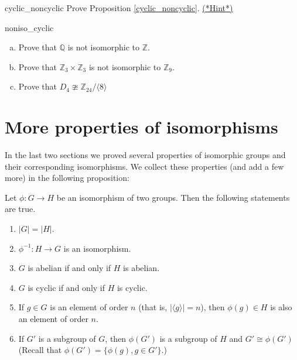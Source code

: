 \begin{exercise}{cyclic_noncyclic} 
Prove Proposition \ref{cyclic_noncyclic}.
\hyperref[sec:isomorph:hints]{(*Hint*)}
\end{exercise}



\begin{exercise}{noniso_cyclic}
\begin{enumerate}[(a)]
\item
Prove that ${\mathbb Q}$ is not isomorphic to ${\mathbb Z}$.
\item
Prove that  ${\mathbb Z}_3 \times {\mathbb Z}_3$ is not isomorphic to ${\mathbb Z}_9$. 
\item
Prove that  $D_4 \ncong {\mathbb Z}_{24} / \langle 8 \rangle$
\end{enumerate}
\end{exercise}



\section{More properties of isomorphisms\quad
{}}\label{iso_properties}
In the last two sections we  proved several properties of isomorphic groups and their corresponding isomorphisms.  We collect these properties (and add a few more) in the following proposition:

\begin{thm}\label{isomorph_theorem_1}
Let $\phi : G \rightarrow H$ be an isomorphism of two groups.  Then the following statements are true. 
\begin{enumerate}[(1)]
 

\rm \item 
$|G| = |H|$. 

\rm \item 
$\phi^{-1} : H \rightarrow G$ is an isomorphism. 

\rm \item 
$G$ is abelian if and only if $H$ is abelian. 

\rm \item 
$G$ is cyclic if and only if $H$ is cyclic. 

\rm \item
If $g \in G$ is an element of order $n$ (that is, $| \langle g \rangle | = n$), then 
$\phi(g) \in H$ is also an element of order $n$.

\rm \item 
If $G'$  is a subgroup of $G$, then $\phi(G') $ is a subgroup of  $H$ and $G' \cong \phi(G')$  (Recall that $\phi(G') = \{ \phi(g), g \in G'\}$.)
 
\end{enumerate}
\end{thm}

